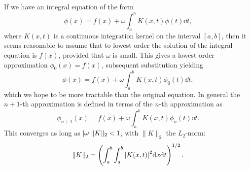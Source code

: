 \documentclass[11pt, a4paper]{report} %
\begin{document}
If we have an integral equation of the form
\begin{equation}
  \phi(x) = f(x) + \omega \int_{a}^b K(x,t)\phi(t) \dd t,
\end{equation}
where $K(x,t)$ is a continuous integration kernel on the interval $[a,b]$, then it seems reasonable to assume that to lowest order the solution of the integral equation is $f(x)$, provided that $\omega$ is small.
This gives a lowest order approximation $\phi_0(x) = f(x)$, subsequent substitution yielding 
\begin{equation}
  \phi(x) = f(x) + \omega \int_{a}^b K(x,t)\phi_0(t) \dd t,
\end{equation}
which we hope to be more tractable than the original equation.
In general the $n+1$-th approximation is defined in terms of the $n$-th approximation as
\begin{equation}
  \phi_{n+1}(x) = f(x) + \omega \int_{a}^b K(x,t)\phi_n(t) \dd t.
\end{equation}
This converges as long as $\abs{\omega} \lVert K \rVert_2 < 1$, with $\lVert K \rVert_2$ the $L_2$-norm:
\begin{equation}
  \lVert K \rVert_2 = \left( \int_{a}^b \int_a^b \abs{K(x,t)}^2 \dd x \dd t\right)^{1/2}.
\end{equation}
\end{document}
